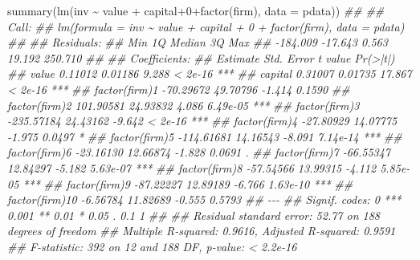 \documentclass[
  letterpaper,
  xelatex,
  ja=standard, xelatex]{bxjsbook}
\newenvironment{Shaded}{\begin{snugshade}}{\end{snugshade}}
\newcommand{\AttributeTok}[1]{\textcolor[rgb]{0.40,0.45,0.13}{#1}}
\newcommand{\DecValTok}[1]{\textcolor[rgb]{0.68,0.00,0.00}{#1}}
\newcommand{\DocumentationTok}[1]{\textcolor[rgb]{0.37,0.37,0.37}{\textit{#1}}}
\newcommand{\FunctionTok}[1]{\textcolor[rgb]{0.28,0.35,0.67}{#1}}
\newcommand{\NormalTok}[1]{\textcolor[rgb]{0.00,0.23,0.31}{#1}}
\newcommand{\SpecialCharTok}[1]{\textcolor[rgb]{0.37,0.37,0.37}{#1}}
\begin{document}
\begin{Shaded}
\begin{Highlighting}[]
\FunctionTok{summary}\NormalTok{(}\FunctionTok{lm}\NormalTok{(inv }\SpecialCharTok{\textasciitilde{}}\NormalTok{ value }\SpecialCharTok{+}\NormalTok{ capital}\SpecialCharTok{+}\DecValTok{0}\SpecialCharTok{+}\FunctionTok{factor}\NormalTok{(firm), }\AttributeTok{data =}\NormalTok{ pdata))}
\DocumentationTok{\#\# }
\DocumentationTok{\#\# Call:}
\DocumentationTok{\#\# lm(formula = inv \textasciitilde{} value + capital + 0 + factor(firm), data = pdata)}
\DocumentationTok{\#\# }
\DocumentationTok{\#\# Residuals:}
\DocumentationTok{\#\#      Min       1Q   Median       3Q      Max }
\DocumentationTok{\#\# {-}184.009  {-}17.643    0.563   19.192  250.710 }
\DocumentationTok{\#\# }
\DocumentationTok{\#\# Coefficients:}
\DocumentationTok{\#\#                  Estimate Std. Error t value Pr(\textgreater{}|t|)    }
\DocumentationTok{\#\# value             0.11012    0.01186   9.288  \textless{} 2e{-}16 ***}
\DocumentationTok{\#\# capital           0.31007    0.01735  17.867  \textless{} 2e{-}16 ***}
\DocumentationTok{\#\# factor(firm)1   {-}70.29672   49.70796  {-}1.414   0.1590    }
\DocumentationTok{\#\# factor(firm)2   101.90581   24.93832   4.086 6.49e{-}05 ***}
\DocumentationTok{\#\# factor(firm)3  {-}235.57184   24.43162  {-}9.642  \textless{} 2e{-}16 ***}
\DocumentationTok{\#\# factor(firm)4   {-}27.80929   14.07775  {-}1.975   0.0497 *  }
\DocumentationTok{\#\# factor(firm)5  {-}114.61681   14.16543  {-}8.091 7.14e{-}14 ***}
\DocumentationTok{\#\# factor(firm)6   {-}23.16130   12.66874  {-}1.828   0.0691 .  }
\DocumentationTok{\#\# factor(firm)7   {-}66.55347   12.84297  {-}5.182 5.63e{-}07 ***}
\DocumentationTok{\#\# factor(firm)8   {-}57.54566   13.99315  {-}4.112 5.85e{-}05 ***}
\DocumentationTok{\#\# factor(firm)9   {-}87.22227   12.89189  {-}6.766 1.63e{-}10 ***}
\DocumentationTok{\#\# factor(firm)10   {-}6.56784   11.82689  {-}0.555   0.5793    }
\DocumentationTok{\#\# {-}{-}{-}}
\DocumentationTok{\#\# Signif. codes:  0 \textquotesingle{}***\textquotesingle{} 0.001 \textquotesingle{}**\textquotesingle{} 0.01 \textquotesingle{}*\textquotesingle{} 0.05 \textquotesingle{}.\textquotesingle{} 0.1 \textquotesingle{} \textquotesingle{} 1}
\DocumentationTok{\#\# }
\DocumentationTok{\#\# Residual standard error: 52.77 on 188 degrees of freedom}
\DocumentationTok{\#\# Multiple R{-}squared:  0.9616, Adjusted R{-}squared:  0.9591 }
\DocumentationTok{\#\# F{-}statistic:   392 on 12 and 188 DF,  p{-}value: \textless{} 2.2e{-}16}
\end{Highlighting}
\end{Shaded}
\end{document}
